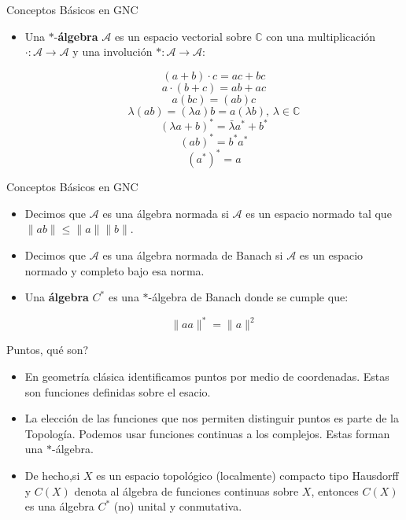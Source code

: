 \documentclass{beamer}
\begin{document}
\begin{frame}{Conceptos Básicos en GNC}

\begin{itemize}

\item Una $*$-{\bf{álgebra}} $\mathcal{A}$ es un espacio vectorial sobre $\mathbb{C}$ con una multiplicación $\cdot : \mathcal{A} \to \mathcal{A} $ y una involución $* : \mathcal{A} \to \mathcal{A}$:
\begin{exampleblock}{}
\[
(a + b) \cdot c = ac + bc
\]
\[
a\cdot (b+c) = ab + ac
\]
\[
a(bc) = (ab)c
\]
\[
\lambda (ab) = (\lambda a)b = a (\lambda b), \, \lambda \in \mathbb{C}
\]
\[
(\lambda a+b)^* = \bar{\lambda} a^* + b^*
\]
\[
(ab)^* = b^* a^*
\]
\[
(a^*)^* = a
\]
\end{exampleblock}
\end{itemize}
\end{frame}



\begin{frame}{Conceptos Básicos en GNC}

\begin{itemize}
\item Decimos que $\mathcal{A}$ es una álgebra normada si $\mathcal{A}$ es un espacio normado tal que $\| ab \| \leq \| a \| \| b \|$.
\vspace{5mm}
\item Decimos que $\mathcal{A}$ es una álgebra normada de Banach si $\mathcal{A}$ es un espacio normado y completo bajo esa norma.
\vspace{5mm}
\item Una {\bf{álgebra}} $C^*$ es una $*$-álgebra de Banach donde se cumple que:
\begin{exampleblock}{}
\[
\|aa\|^* = \| a \|^2
\]
\end{exampleblock}
\end{itemize}
\end{frame}



\begin{frame}{Puntos, qué son?}

\begin{itemize}
\item En geometría clásica identificamos puntos por medio de coordenadas. Estas son funciones definidas sobre el esacio.
\vspace{5mm}
\item La elección de las funciones que nos permiten distinguir puntos es parte de la Topología. Podemos usar funciones continuas a los complejos. Estas forman una $*$-álgebra.
\vspace{5mm}
\item De hecho,si $X$ es un espacio topológico (localmente) compacto tipo Hausdorff y $C(X)$ denota al álgebra de funciones continuas sobre $X$, entonces $C(X)$ es una álgebra $C^*$ (no) unital y conmutativa.
\end{itemize}
\end{frame}
\end{document}
